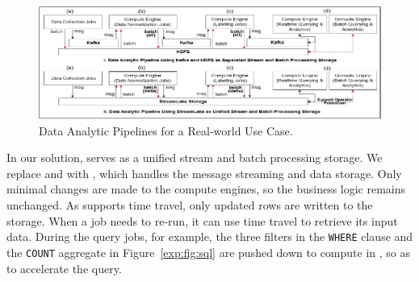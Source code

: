  
 \begin{figure}[htbp]
 	\includegraphics[scale=1.05]{figures/case}
 	\centering
 	\vspace{-1em}
 	\caption{Data Analytic Pipelines for a  Real-world Use Case.}
 	\label{exp:fig:case}
 \end{figure}
 
  In our solution, \sys serves as a unified stream and batch processing storage. 
  We replace \kafka and \hdfs with \sys, which handles the message streaming and data storage. 
  Only minimal changes are made to the compute engines, so the business logic remains unchanged. 
  As \sys supports time travel, only updated rows are written to the storage. When a job needs to re-run, it can use time travel to retrieve its input data.  During the query jobs, for example, the three filters in the \texttt{WHERE} clause and the \texttt{COUNT} aggregate in Figure~\ref{exp:fig:sql} are pushed down to compute in \sys, so as to  accelerate the query.


